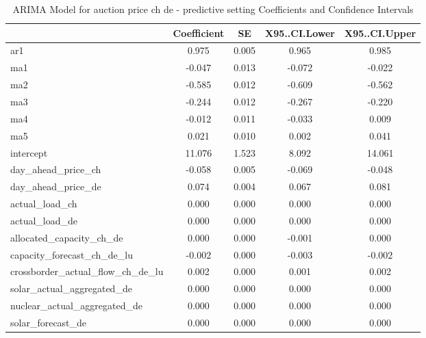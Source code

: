 \begin{table}
\caption{ARIMA Model for auction price ch de - predictive setting Coefficients and Confidence Intervals}
\centering
\begin{tabular}[t]{l|c|c|c|c}
\hline
  & Coefficient & SE & X95..CI.Lower & X95..CI.Upper\\
\hline
ar1 & 0.975 & 0.005 & 0.965 & 0.985\\
\hline
ma1 & -0.047 & 0.013 & -0.072 & -0.022\\
\hline
ma2 & -0.585 & 0.012 & -0.609 & -0.562\\
\hline
ma3 & -0.244 & 0.012 & -0.267 & -0.220\\
\hline
ma4 & -0.012 & 0.011 & -0.033 & 0.009\\
\hline
ma5 & 0.021 & 0.010 & 0.002 & 0.041\\
\hline
intercept & 11.076 & 1.523 & 8.092 & 14.061\\
\hline
day\_ahead\_price\_ch & -0.058 & 0.005 & -0.069 & -0.048\\
\hline
day\_ahead\_price\_de & 0.074 & 0.004 & 0.067 & 0.081\\
\hline
actual\_load\_ch & 0.000 & 0.000 & 0.000 & 0.000\\
\hline
actual\_load\_de & 0.000 & 0.000 & 0.000 & 0.000\\
\hline
allocated\_capacity\_ch\_de & 0.000 & 0.000 & -0.001 & 0.000\\
\hline
capacity\_forecast\_ch\_de\_lu & -0.002 & 0.000 & -0.003 & -0.002\\
\hline
crossborder\_actual\_flow\_ch\_de\_lu & 0.002 & 0.000 & 0.001 & 0.002\\
\hline
solar\_actual\_aggregated\_de & 0.000 & 0.000 & 0.000 & 0.000\\
\hline
nuclear\_actual\_aggregated\_de & 0.000 & 0.000 & 0.000 & 0.000\\
\hline
solar\_forecast\_de & 0.000 & 0.000 & 0.000 & 0.000\\
\hline
\end{tabular}
\end{table}\begin{table}


\end{table}
